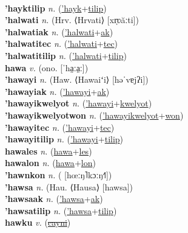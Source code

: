  \label{'hayktec} \\
\textbf{'hayktilip} \textit{n.} (\hyperref['hayk]{'hayk}+\hyperref[tilip]{tilip})
 \label{'hayktilip} \\
\textbf{'halwati} \textit{n.} (Hrv. ⟨Hrvati⟩ [xr̩ʋăːti])
 \label{'halwati} \\
\textbf{'halwatiak} \textit{n.} (\hyperref['halwati]{'halwati}+\hyperref[ak]{ak})
 \label{'halwatiak} \\
\textbf{'halwatitec} \textit{n.} (\hyperref['halwati]{'halwati}+\hyperref[tec]{tec})
 \label{'halwatitec} \\
\textbf{'halwatitilip} \textit{n.} (\hyperref['halwati]{'halwati}+\hyperref[tilip]{tilip})
 \label{'halwatitilip} \\
\textbf{hawa} \textit{v.} (ono. [ˈha̤ːa̤ː])
 \label{hawa} \\
\textbf{'hawayi} \textit{n.} (Haw. ⟨Hawaiʻi⟩ [həˈvɐjʔi])
 \label{'hawayi} \\
\textbf{'hawayiak} \textit{n.} (\hyperref['hawayi]{'hawayi}+\hyperref[ak]{ak})
 \label{'hawayiak} \\
\textbf{'hawayikwelyot} \textit{n.} (\hyperref['hawayi]{'hawayi}+\hyperref[kwelyot]{kwelyot})
 \label{'hawayikwelyot} \\
\textbf{'hawayikwelyotwon} \textit{n.} (\hyperref['hawayikwelyot]{'hawayikwelyot}+\hyperref[won]{won})
 \label{'hawayikwelyotwon} \\
\textbf{'hawayitec} \textit{n.} (\hyperref['hawayi]{'hawayi}+\hyperref[tec]{tec})
 \label{'hawayitec} \\
\textbf{'hawayitilip} \textit{n.} (\hyperref['hawayi]{'hawayi}+\hyperref[tilip]{tilip})
 \label{'hawayitilip} \\
\textbf{hawales} \textit{n.} (\hyperref[hawa]{hawa}+\hyperref[les]{les})
 \label{hawales} \\
\textbf{hawalon} \textit{n.} (\hyperref[hawa]{hawa}+\hyperref[lon]{lon})
 \label{hawalon} \\
\textbf{'hawnkon} \textit{n.} ( [hœːŋ˥kɔːŋ˧˥])
 \label{'hawnkon} \\
\textbf{'hawsa} \textit{n.} (Hau. ⟨Hausa⟩ [hawsa])
 \label{'hawsa} \\
\textbf{'hawsaak} \textit{n.} (\hyperref['hawsa]{'hawsa}+\hyperref[ak]{ak})
 \label{'hawsaak} \\
\textbf{'hawsatilip} \textit{n.} (\hyperref['hawsa]{'hawsa}+\hyperref[tilip]{tilip})
 \label{'hawsatilip} \\
\textbf{hawku} \textit{v.} (\hyperref[cayni]{\sout{cayni}})
